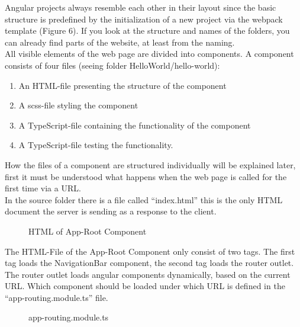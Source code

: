 Angular projects always resemble each other in their layout since the basic structure is predefined by the initialization of a new project via the webpack template (Figure 6). If you look at the structure and names of the folders, you can already find parts of the website, at least from the naming. \\
All visible elements of the web page are divided into components. A component consists of four files (seeing folder HelloWorld/hello-world): 
\begin{enumerate}
	\item An HTML-file presenting the structure of the component 
	\item A scss-file styling the component 
	\item A TypeScript-file containing the functionality of the component 
	\item A TypeScript-file testing the functionality. 
\end{enumerate}
How the files of a component are structured individually will be explained later, first it must be understood what happens when the web page is called for the first time via a URL. \\
In the source folder there is a file called “index.html” this is the only HTML document the server is sending as a response to the client. 
\begin{figure}[h]
	\centering
	\caption{HTML of App-Root Component}
	\label{fig:htmlapproot}
\end{figure}
The HTML-File of the App-Root Component only consist of two tags. The first tag loads the NavigationBar component, the second tag loads the router outlet. The router outlet loads angular components dynamically, based on the current URL. Which component should be loaded under which URL is defined in the \enquote{app-routing.module.ts} file.
\begin{figure}[h]
	\centering
	\caption{app-routing.module.ts}
	\label{fig:approutingmodule}
\end{figure}
